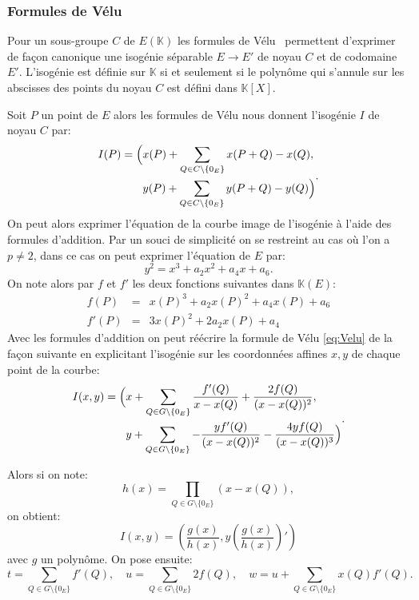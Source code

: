 \documentclass[10pt,a4paper]{book}
\theoremstyle{plain}
\theoremstyle{definition}
\theoremstyle{definition}
\theoremstyle{definition}
\theoremstyle{definition}
\theoremstyle{definition}
\theoremstyle{remark}
\theoremstyle{remark}
\theoremstyle{definition}
\begin{document}
\subsubsection{Formules de Vélu}
\label{sse:Vel}
Pour un sous-groupe $C$ de $E(\mathbb{K})$ les formules de Vélu~\cite{velu1971} permettent d'exprimer de façon canonique une isogénie séparable $E \rightarrow E'$ de noyau $C$ et de codomaine $E'$.  L'isogénie est définie sur $\mathbb{K}$ si et seulement si le polynôme qui s'annule sur les abscisses des points du noyau $C$ est défini dans $\mathbb{K}[X]$.

Soit $P$ un point de $E$ alors les formules de Vélu nous donnent l'isogénie $I$ de noyau $C$ par: 
\begin{equation}
\label{eq:Velu}
\begin{alignedat}{1}
I(P)= \Bigl( &  x(P)+\sum_{Q \in C \setminus \{0_E\}} x(P+Q)-x(Q), \\
& y(P)+\sum_{Q \in C \setminus \{0_E\}} y(P+Q)-y(Q) \Bigr)
\end{alignedat}.
\end{equation} 
On peut alors exprimer l'équation de la courbe image de l'isogénie à l'aide des
formules d'addition. Par un souci de simplicité on se restreint au cas où l'on 
a $p \neq 2$, dans ce cas on peut exprimer l'équation de $E$ par:
\begin{equation*}
y^2=x^3+a_2 x^2 + a_4 x + a_6.
\end{equation*}
On note alors par $f$ et $f'$ les deux fonctions suivantes dans $\mathbb{K}(E)$:
\begin{align*}
f(P)&=& x(P)^3+a_2x(P)^2+a_4x(P)+a_6 \\
f'(P)&=& 3x(P)^2+2a_2x(P)+a_4
\end{align*}
Avec les formules d'addition on peut réécrire la formule de Vélu \eqref{eq:Velu} de la façon suivante en explicitant l'isogénie sur les coordonnées affines $x,y$ de chaque point de la courbe:
\begin{equation} 
\begin{alignedat}{1}
I(x,y)= \Bigl( &  x + \sum_{Q \in G \setminus \{0_E\}} \frac{f'(Q)}{x-x(Q)}+\frac{2f(Q)}{(x-x(Q))^2}, \\
  &  y + \sum_{Q \in G \setminus \{0_E\}} -\frac{yf'(Q)}{(x-x(Q))^2}-\frac{4yf(Q)}{(x-x(Q))^3} \Bigr) 
\end{alignedat}.
\label{eq:velu:sum}
\end{equation}

Alors si on note: 
\begin{equation*}
h(x)=\prod_{Q \in G \setminus \{0_E\}}(x-x(Q)),
\end{equation*}
on obtient:
\begin{equation} 
\label{eq:velu:gh}
I(x,y)=\left(\frac{g(x)}{h(x)},y\left( \frac{g(x)}{h(x)} \right)'\right)
\end{equation}
avec $g$ un polynôme. On pose ensuite:
\begin{equation*}
t= \sum_{Q \in G \setminus \{0_E\}} f'(Q), \quad u=\sum_{Q \in G \setminus \{0_E\}} 2f(Q), \quad w=u+\sum_{Q \in G \setminus \{0_E\}}x(Q)f'(Q). 
\end{equation*}
\end{document}
